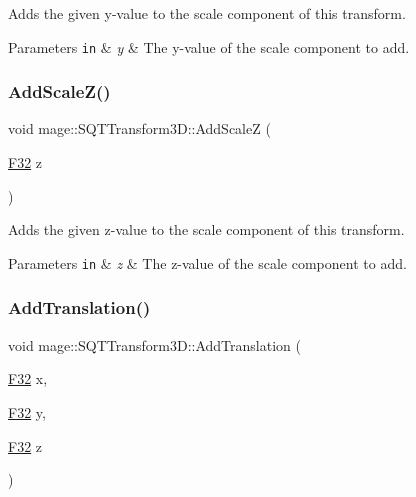 Adds the given y-\/value to the scale component of this transform.


\begin{DoxyParams}[1]{Parameters}
\mbox{\tt in}  & {\em y} & The y-\/value of the scale component to add. \\
\hline
\end{DoxyParams}
\mbox{\label{classmage_1_1_s_q_t_transform3_d_a57302a68398cb2f29509029b807a9943}} 
\subsubsection{\texorpdfstring{Add\+Scale\+Z()}{AddScaleZ()}}
{\footnotesize\ttfamily void mage\+::\+S\+Q\+T\+Transform3\+D\+::\+Add\+ScaleZ (\begin{DoxyParamCaption}\item[{\mbox{\hyperlink{namespacemage_aa97e833b45f06d60a0a9c4fc22ae02c0}{F32}}}]{z }\end{DoxyParamCaption})\hspace{0.3cm}{\ttfamily [noexcept]}}

Adds the given z-\/value to the scale component of this transform.


\begin{DoxyParams}[1]{Parameters}
\mbox{\tt in}  & {\em z} & The z-\/value of the scale component to add. \\
\hline
\end{DoxyParams}
\mbox{\label{classmage_1_1_s_q_t_transform3_d_adba7c087084b98f60f8c00e0d60245cd}} 
\subsubsection{\texorpdfstring{Add\+Translation()}{AddTranslation()}\hspace{0.1cm}{\footnotesize\ttfamily [1/3]}}
{\footnotesize\ttfamily void mage\+::\+S\+Q\+T\+Transform3\+D\+::\+Add\+Translation (\begin{DoxyParamCaption}\item[{\mbox{\hyperlink{namespacemage_aa97e833b45f06d60a0a9c4fc22ae02c0}{F32}}}]{x,  }\item[{\mbox{\hyperlink{namespacemage_aa97e833b45f06d60a0a9c4fc22ae02c0}{F32}}}]{y,  }\item[{\mbox{\hyperlink{namespacemage_aa97e833b45f06d60a0a9c4fc22ae02c0}{F32}}}]{z }\end{DoxyParamCaption})\hspace{0.3cm}{\ttfamily [noexcept]}}

